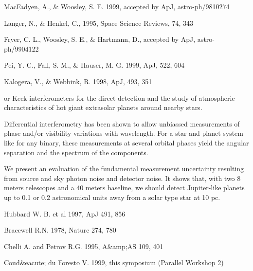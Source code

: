 {{{{{{{{{{{{{{ MacFadyen, A., & Woosley, S. E. 1999, accepted by ApJ, astro-ph/9810274

 Langer, N., & Henkel, C., 1995, Space Science Reviews, 74, 343

 Fryer, C. L., Woosley, S. E., & Hartmann, D., accepted by ApJ, astro-ph/9904122

 Pei, Y. C., Fall, S. M., & Hauser, M. G. 1999, ApJ, 522, 604

 Kalogera, V., & Webbink, R. 1998, ApJ, 493, 351



or Keck interferometers for the direct detection and the study of
atmospheric characteristics of hot giant extrasolar planets around
nearby stars.

Differential interferometry has been shown to allow unbiassed
measurements of phase and/or visibility variations with wavelength.
For a star and planet system like for any binary, these measurements
at several orbital phases yield the angular separation and the
spectrum of the components.

We present an evaluation of the fundamental measurement uncertainty
resulting from source and sky photon noise and detector noise.  It
shows that, with two 8 meters telescopes and a 40 meters baseline, we
should detect Jupiter-like planets up to 0.1 or 0.2 astronomical units
away from a solar type star at 10 pc.

Hubbard W. B. et al 1997, ApJ 491, 856

 Bracewell R.N. 1978, Nature 274, 780

 Chelli A. and Petrov R.G. 1995, A&amp;AS 109, 401

 Coud&eacute; du Foresto V. 1999,
this symposium (Parallel Workshop 2)

}}}}}}}}}}}}}}
